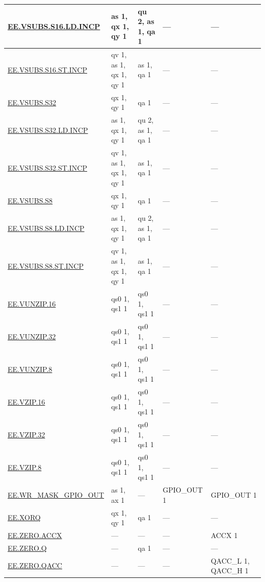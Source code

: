\begin{longtable}[c]{|l|m{2.5cm}|m{2.5cm}|m{2.5cm}|m{2.5cm}|}
    \hyperref[instruction:EEVSUBSS16LDINCP]{EE.VSUBS.S16.LD.INCP} & as 1, qx 1, qy 1 & qu 2, as 1, qa 1 & — & — \\\hline
    \hyperref[instruction:EEVSUBSS16STINCP]{EE.VSUBS.S16.ST.INCP} & qv 1, as 1, qx 1, qy 1 & as 1, qa 1 & — & — \\\hline
    \hyperref[instruction:EEVSUBSS32]{EE.VSUBS.S32} & qx 1, qy 1 & qa 1 & — & — \\\hline
    \hyperref[instruction:EEVSUBSS32LDINCP]{EE.VSUBS.S32.LD.INCP} & as 1, qx 1, qy 1 & qu 2, as 1, qa 1 & — & — \\\hline
    \hyperref[instruction:EEVSUBSS32STINCP]{EE.VSUBS.S32.ST.INCP} & qv 1, as 1, qx 1, qy 1 & as 1, qa 1 & — & — \\\hline
    \hyperref[instruction:EEVSUBSS8]{EE.VSUBS.S8} & qx 1, qy 1 & qa 1 & — & — \\\hline
    \hyperref[instruction:EEVSUBSS8LDINCP]{EE.VSUBS.S8.LD.INCP} & as 1, qx 1, qy 1 & qu 2, as 1, qa 1 & — & — \\\hline
    \hyperref[instruction:EEVSUBSS8STINCP]{EE.VSUBS.S8.ST.INCP} & qv 1, as 1, qx 1, qy 1 & as 1, qa 1 & — & — \\\hline
    \hyperref[instruction:EEVUNZIP16]{EE.VUNZIP.16} & qs0 1, qs1 1 & qs0 1, qs1 1 & — & — \\\hline
    \hyperref[instruction:EEVUNZIP32]{EE.VUNZIP.32} & qs0 1, qs1 1 & qs0 1, qs1 1 & — & — \\\hline
    \hyperref[instruction:EEVUNZIP8]{EE.VUNZIP.8} & qs0 1, qs1 1 & qs0 1, qs1 1 & — & — \\\hline
    \hyperref[instruction:EEVZIP16]{EE.VZIP.16} & qs0 1, qs1 1 & qs0 1, qs1 1 & — & — \\\hline
    \hyperref[instruction:EEVZIP32]{EE.VZIP.32} & qs0 1, qs1 1 & qs0 1, qs1 1 & — & — \\\hline
    \hyperref[instruction:EEVZIP8]{EE.VZIP.8} & qs0 1, qs1 1 & qs0 1, qs1 1 & — & — \\\hline
    \hyperref[instruction:EEWRMASKGPIOOUT]{EE.WR\_MASK\_GPIO\_OUT} & as 1, ax 1 & — & GPIO\_OUT 1 & GPIO\_OUT 1 \\\hline
    \hyperref[instruction:EEXORQ]{EE.XORQ} & qx 1, qy 1 & qa 1 & — & — \\\hline
    \hyperref[instruction:EEZEROACCX]{EE.ZERO.ACCX} & — & — & — & ACCX 1\\\hline
    \hyperref[instruction:EEZEROQ]{EE.ZERO.Q} & — & qa 1 & — & — \\\hline
    \hyperref[instruction:EEZEROQACC]{EE.ZERO.QACC} & — & — & — & QACC\_L 1, QACC\_H 1\\\hline
\end{longtable}